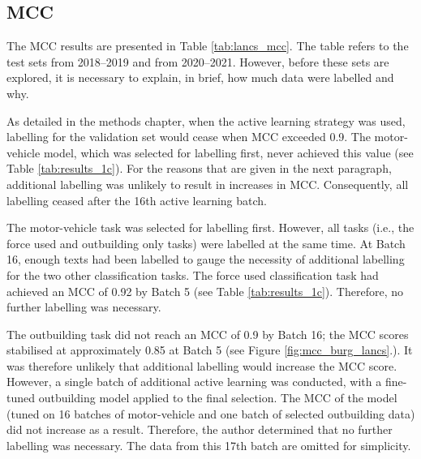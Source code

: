 \subsection{MCC} The MCC results are presented in Table \ref{tab:lancs_mcc}. The table refers to the test sets from 2018–2019 and from 2020–2021. However, before these sets are explored, it is necessary to explain, in brief, how much data were labelled and why.
 
 As detailed in the methods chapter, when the active learning strategy was used, labelling for the validation set would cease when MCC exceeded 0.9. The motor-vehicle model, which was selected for labelling first,  never achieved this value (see Table  \ref{tab:results_1c}). For the reasons that are given in the next paragraph, additional labelling was unlikely to result in increases in MCC. Consequently, all labelling ceased after the 16th active learning batch. 

The motor-vehicle task was selected for labelling first. However, all tasks (i.e., the force used and outbuilding only tasks) were labelled at the same time. At Batch 16, enough texts had been labelled to gauge the necessity of additional labelling for the two other classification tasks. The force used classification task had achieved an MCC of 0.92 by Batch 5 (see Table \ref{tab:results_1c}). Therefore, no further labelling was necessary.

The outbuilding task did not reach an MCC of 0.9 by Batch 16; the MCC scores stabilised at approximately 0.85 at Batch 5 (see Figure  \ref{fig:mcc_burg_lancs}.). It was therefore unlikely that additional labelling would increase the MCC score. However, a single batch of additional active learning was conducted, with a fine-tuned outbuilding model applied to the final selection. The MCC of the model (tuned on 16 batches of motor-vehicle and one batch of selected outbuilding data) did not increase as a result. Therefore, the author determined that no further labelling was necessary. The data from this 17th batch are omitted for simplicity.

